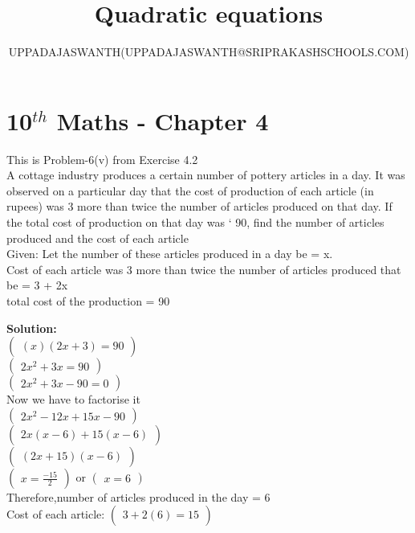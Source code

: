 \documentclass[12pt]{article}
\title{Quadratic equations}
\author{UPPADAJASWANTH(UPPADAJASWANTH@SRIPRAKASHSCHOOLS.COM)}
\newcommand{\myvec}[1]{\ensuremath{\begin{pmatrix}#1\end{pmatrix}}}
\newcommand{\solution}{\noindent \textbf{Solution: }}
\begin{document}
\section*{10$^{th}$ Maths - Chapter 4}
This is Problem-6(v) from Exercise 4.2\\
A cottage industry produces a certain number of pottery articles in a day. It was observed
on a particular day that the cost of production of each article (in rupees) was 3 more than
twice the number of articles produced on that day. If the total cost of production on that
day was ` 90, find the number of articles produced and the cost of each article\\
Given:
Let the number of these articles produced in a day be = x.\\
Cost of each article was 3 more than twice the number of articles
produced that be = 3 + 2x\\
total cost of the production = 90

\solution\\
\myvec{(x)(2x + 3) = 90}\\
\myvec{2x^2+3x=90}\\
\myvec{2x^2+3x-90=0}\\
Now we have to factorise it\\
\myvec{2x^2-12x+15x-90}\\
\myvec{2x(x-6)+15(x-6)}\\
\myvec{(2x+15)(x-6)}\\
\myvec{x=\frac{-15}{2}}
or
\myvec{x=6}\\
Therefore,number of articles produced in the day = 6\\
Cost of each article:
\myvec{3+2(6)=15}
\end{document}
